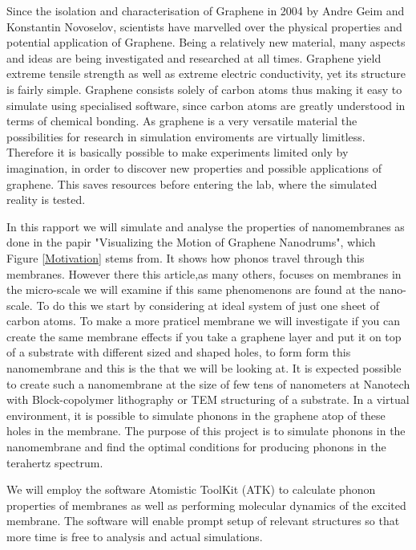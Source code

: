 
Since the isolation and characterisation of
Graphene in 2004 by Andre Geim and
Konstantin Novoselov, scientists have marvelled over the physical properties and potential
application of Graphene. Being a relatively new material, many aspects and ideas are being
investigated and researched at all times. Graphene yield extreme tensile strength as well as
extreme electric conductivity, yet its structure is fairly simple. Graphene consists solely of
carbon atoms thus making it easy to simulate using specialised software, since carbon atoms are greatly understood in terms of chemical
bonding.
As graphene is a very versatile material the possibilities for research in simulation enviroments are virtually limitless.
Therefore it is basically possible to make experiments limited only by imagination, in order
to discover new properties and possible applications of graphene. This saves resources
before entering the lab, where the simulated reality is tested.

In this rapport we will simulate and analyse the properties of nanomembranes as done in the papir "Visualizing the Motion of Graphene Nanodrums"\cite{Davidovikj2016}, which Figure \cref{Motivation} stems from. It shows how phonos travel through this membranes. However there this article,as many others, focuses on membranes in the micro-scale we will examine if this same phenomenons are found at the nano-scale. To do this we start by considering at ideal system of just one sheet of carbon atoms.
To make a more praticel membrane we will investigate if you can create the same membrane effects if you take a graphene layer and put it on top of a substrate with different sized and shaped holes, to form
form this nanomembrane and this is the that we will be looking at. It is expected possible to create such a nanomembrane at the
size of few tens of nanometers at Nanotech with Block-copolymer lithography or TEM
structuring of a substrate. In a virtual environment, it is possible to simulate phonons
in the graphene atop of these holes in the membrane. The purpose of this project is to
simulate phonons in the nanomembrane and find the optimal conditions for producing
phonons in the terahertz spectrum.

We will employ the software Atomistic ToolKit (ATK) to calculate phonon properties
of membranes as well as performing molecular dynamics of the excited membrane. The
software will enable prompt setup of relevant structures so that more time is free to analysis
and actual simulations.


